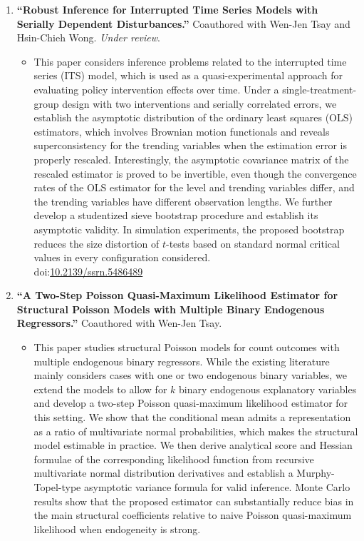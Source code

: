 \documentclass{article}
\begin{document}
\begin{enumerate}
    \item \textbf{“Robust Inference for Interrupted Time Series Models with Serially Dependent Disturbances.”} Coauthored with Wen-Jen Tsay and Hsin-Chieh Wong. \textit{Under review}.
    \begin{itemize}
        \item[] This paper considers inference problems related to the interrupted time series (ITS) model, which is used as a quasi-experimental approach for evaluating policy intervention effects over time. Under a single-treatment-group design with two interventions and serially correlated errors, we establish the asymptotic distribution of the ordinary least squares (OLS) estimators, which involves Brownian motion functionals and reveals superconsistency for the trending variables when the estimation error is properly rescaled. Interestingly, the asymptotic covariance matrix of the rescaled estimator is proved to be invertible, even though the convergence rates of the OLS estimator for the level and trending variables differ, and the trending variables have different observation lengths. We further develop a studentized sieve bootstrap procedure and establish its asymptotic validity. In simulation experiments, the proposed bootstrap reduces the size distortion of $t$-tests based on standard normal critical values in every configuration considered.\\ doi:\href{https://dx.doi.org/10.2139/ssrn.5486489}{10.2139/ssrn.5486489}
    \end{itemize}
    \item \textbf{“A Two-Step Poisson Quasi-Maximum Likelihood Estimator for Structural Poisson Models with Multiple Binary Endogenous Regressors.”} Coauthored with Wen-Jen Tsay.
    \begin{itemize}
        \item[] This paper studies structural Poisson models for count outcomes with multiple endogenous binary regressors. While the existing literature mainly considers cases with one or two endogenous binary variables, we extend the models to allow for $k$ binary endogenous explanatory variables and develop a two-step Poisson quasi-maximum likelihood estimator for this setting. We show that the conditional mean admits a representation as a ratio of multivariate normal probabilities, which makes the structural model estimable in practice. We then derive analytical score and Hessian formulae of the corresponding likelihood function from recursive multivariate normal distribution derivatives and establish a Murphy-Topel-type asymptotic variance formula for valid inference. Monte Carlo results show that the proposed estimator can substantially reduce bias in the main structural coefficients relative to naive Poisson quasi-maximum likelihood when endogeneity is strong.
    \end{itemize}
\end{enumerate}
\end{document}
